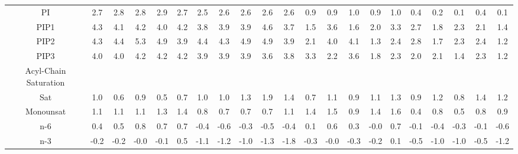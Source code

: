 \documentclass[preprint,3p,9pt,times,onecolumn]{elsarticle}
\begin{document}
\begin{table}
{\begin{tabular}{| c || cccccccccccccccccccc |}
PI      & 2.7        & 2.8        & 2.8        & 2.9        & 2.7        & 2.5        & 2.6        & 2.6        & 2.6        & 2.6        & 0.9        & 0.9        & 1.0        & 0.9        & 1.0        & 0.4        & 0.2        & 0.1        & 0.4        & 0.1        \\
PIP1     & 4.3        & 4.1        & 4.2        & 4.0        & 4.2        & 3.8        & 3.9        & 3.9        & 4.6        & 3.7        & 1.5        & 3.6        & 1.6        & 2.0        & 3.3        & 2.7        & 1.8        & 2.3        & 2.1        & 1.4        \\
PIP2     & 4.3        & 4.4        & 5.3        & 4.9        & 3.9        & 4.4        & 4.3        & 4.9        & 4.9        & 3.9        & 2.1        & 4.0        & 4.1        & 1.3        & 2.4        & 2.8        & 1.7        & 2.3        & 2.4        & 1.2        \\
PIP3     & 4.0        & 4.0        & 4.2        & 4.2        & 4.2        & 3.9        & 3.9        & 3.9        & 3.6        & 3.8        & 3.3        & 2.2        & 3.6        & 1.8        & 2.3        & 2.0        & 2.1        & 1.4        & 2.3        & 1.2        \\ 
\hline
\hline
Acyl-Chain Saturation &&&&&&&&&&&&&&&&&&&&\\\hline
Sat      & 1.0        & 0.6        & 0.9        & 0.5        & 0.7        & 1.0        & 1.0        & 1.3        & 1.9        & 1.4        & 0.7        & 1.1        & 0.9        & 1.1        & 1.3        & 0.9        & 1.2        & 0.8        & 1.4        & 1.2        \\
Monounsat      & 1.1        & 1.1        & 1.1        & 1.3        & 1.4        & 0.8        & 0.7        & 0.7        & 0.7        & 1.1        & 1.4        & 1.5        & 0.9        & 1.4        & 1.6        & 0.4        & 0.8        & 0.5        & 0.8        & 0.9        \\
n-6      & 0.4        & 0.5        & 0.8        & 0.7        & 0.7        & -0.4       & -0.6       & -0.3       & -0.5       & -0.4       & 0.1        & 0.6        & 0.3        & -0.0       & 0.7        & -0.1       & -0.4       & -0.3       & -0.1       & -0.6       \\
n-3      & -0.2       & -0.2       & -0.0       & -0.1       & 0.5        & -1.1       & -1.2       & -1.0       & -1.3       & -1.8       & -0.3       & -0.0       & -0.3       & -0.2       & 0.1        & -0.5       & -1.0       & -1.0       & -0.5       & -1.2       \\

\end{tabular}}
\end{table}
\end{document}
